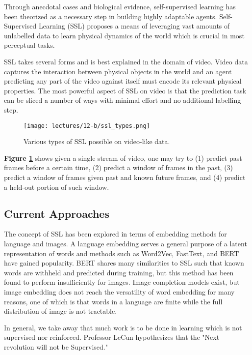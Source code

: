 Through anecdotal cases and biological evidence, self-supervised learning has been theorized as a necessary step in building highly adaptable agents. 
Self-Supervised Learning (SSL) proposes a means of leveraging vast amounts of unlabelled data to learn physical dynamics of the world which is crucial in most perceptual tasks. 

SSL takes several forms and is best explained in the domain of video. Video data captures the interaction between physical objects in the world and an agent predicting any part of the video against itself must encode its relevant physical properties. The most powerful aspect of SSL on video is that the prediction task can be sliced a number of ways with minimal effort and no additional labelling step.

\begin{figure}
\texttt{[image: lectures/12-b/ssl\_types.png]}
\centering
\caption{Various types of SSL possible on video-like data.}
\label{fig:ssl_types}
\end{figure}

\textbf{Figure \ref{fig:ssl_types}} shows given a single stream of video, one may try to (1) predict past frames before a certain time, (2) predict a window of frames in the past, (3) predict a window of frames given past and known future frames, and (4) predict a held-out portion of such window. 

\subsection{Current Approaches}

The concept of SSL has been explored in terms of embedding methods for language and images. 
A language embedding serves a general purpose of a latent representation of words and methods such as Word2Vec, FastText, and BERT have gained popularity. 
BERT shares many similarities to SSL such that known words are withheld and predicted during training, but this method has been found to perform insufficiently for images. 
Image completion models exist, but image embedding does not reach the versatility of word embedding for many reasons, one of which is that words in a language are finite while the full distribution of image is not tractable.

In general, we take away that much work is to be done in learning which is not supervised nor reinforced. Professor LeCun hypothesizes that the "Next revolution will not be Supervised."

